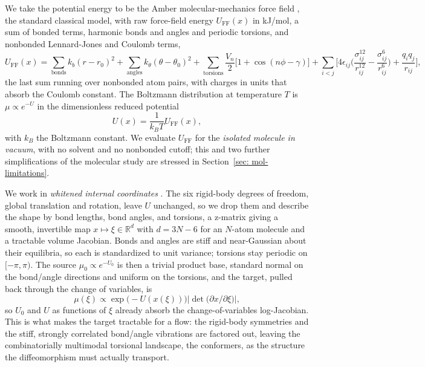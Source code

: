 \documentclass{article}
\begin{document}
We take the potential energy to be the Amber molecular-mechanics force field \citep{cornell1995amber}, the
standard classical model, with raw force-field energy $U_{\mathrm{FF}}(x)$ in kJ/mol, a sum of bonded terms, harmonic bonds and angles and
periodic torsions, and nonbonded Lennard-Jones and Coulomb terms,
\begin{equation}
    U_{\mathrm{FF}}(x) = \!\!\sum_{\text{bonds}}\!\! k_b (r-r_0)^2 + \!\!\sum_{\text{angles}}\!\! k_\theta (\theta-\theta_0)^2
    + \!\!\sum_{\text{torsions}}\!\! \frac{V_n}{2}\big[1+\cos(n\phi-\gamma)\big]
    + \sum_{i<j}\!\bigg[ 4\epsilon_{ij}\bigg(\frac{\sigma_{ij}^{12}}{r_{ij}^{12}} - \frac{\sigma_{ij}^{6}}{r_{ij}^{6}}\bigg) + \frac{q_i q_j}{r_{ij}} \bigg],
    \label{eq: amber}
\end{equation}
the last sum running over nonbonded atom pairs, with charges in units that absorb the Coulomb constant. The
Boltzmann distribution at temperature $T$ is $\mu \propto e^{-U}$ in the dimensionless reduced potential
\begin{equation*}
    U(x) = \frac{1}{k_B T} U_{\mathrm{FF}}(x),
\end{equation*}
with $k_B$ the Boltzmann constant. We evaluate $U_{\mathrm{FF}}$ for the \emph{isolated
molecule in vacuum}, with no solvent and no nonbonded cutoff; this and two further simplifications of the
molecular study are stressed in Section~\ref{sec: mol-limitations}.

We work in \emph{whitened internal coordinates} \citep{noe2019boltzmann}. The six rigid-body degrees of
freedom, global translation and rotation, leave $U$ unchanged, so we drop them and describe the shape by
bond lengths, bond angles, and torsions, a z-matrix giving a smooth, invertible map $x \mapsto \xi \in
\mathbb R^{d}$ with $d = 3N - 6$ for an $N$-atom molecule and a tractable volume Jacobian. Bonds and angles are stiff and near-Gaussian
about their equilibria, so each is standardized to unit variance; torsions stay periodic on $[-\pi,\pi)$. The
source $\mu_0 \propto e^{-U_0}$ is then a trivial product base, standard normal on the bond/angle
directions and uniform on the torsions, and the target, pulled back through the change of variables, is
\begin{equation*}
    \mu(\xi) \propto \exp\!\big(\!-U(x(\xi))\big)\big|\det\big(\partial x/\partial \xi\big)\big|,
\end{equation*}
so $U_0$ and $U$ as functions of $\xi$ already absorb the change-of-variables log-Jacobian. This is what
makes the target tractable for a flow: the rigid-body symmetries and the stiff, strongly correlated
bond/angle vibrations are factored out, leaving the combinatorially multimodal torsional landscape, the
conformers, as the structure the diffeomorphism must actually transport.
\end{document}
